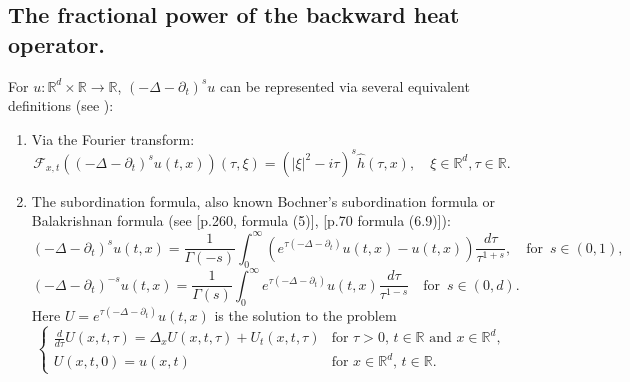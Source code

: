 \documentclass[11pt, twoside, notitlepage]{amsart}
\newcommand\R{\mathbb{R}}
\newcommand\RN{\mathbb{R}^N}
\numberwithin{equation}{section}
\begin{document}
\subsection{The fractional power of the backward heat operator.}  For $u:\R^d\times \R  \to \R$,
$(-\Delta-\partial_t)^s u $ can be represented via several equivalent definitions (see \cite{StingaTorreaMastersEq,BanerjeeGarofalo}):
\begin{enumerate}
\item[(a)] Via the Fourier transform:
\begin{equation}
	\mathcal{F}_{x,t}((-\Delta-\partial_t)^s u(t,x)) (\tau,\xi)=(|\xi|^2-i \tau)^s \widehat{h}(\tau,x), \quad \xi \in \R^d, \tau\in \R.
\end{equation}
\item[(b)] The subordination formula, also known Bochner's subordination formula or Balakrishnan formula (see [p.260, formula (5)]\cite{Yosida},  [p.70 formula (6.9)]\cite{Pazy}):
\begin{equation}\label{def:FracHeatOperator}
(-\Delta-\partial_t)^s u(t,x) =\frac{1}{\Gamma(-s)}\int_0^\infty \left(e^{\tau (-\Delta-\partial_t) } u(t,x)- u(t,x)\right) \frac{d\tau}{\tau^{1+s}}, \quad \text{for } \, s\in (0,1),
\end{equation}
\begin{equation}\label{def:InverseFracHeatOperator}
(-\Delta-\partial_t)^{-s} u(t,x) =\frac{1}{\Gamma(s)}\int_0^\infty e^{\tau (-\Delta-\partial_t) } u(t,x) \frac{d\tau}{\tau^{1-s}}\quad \text{for } \, s\in (0,d).
\end{equation}
Here $U=e^{\tau (-\Delta-\partial_t) } u(t,x)$ is the solution to the problem
\begin{equation}\label{eq2:U-RN}
  \left\{ \begin{array}{ll}
  \frac{d}{d\tau}U(x,t,\tau)=\Delta_{x} U(x,t,\tau) +  U_t(x,t,\tau) &\text{for }\tau>0,\, t \in  \R \text{ and } x \in \R^d,  \\[2mm]
  U(x,t,0)=u(x,t) &\text{for } x \in \R^d, \, t \in  \R .
    \end{array}
    \right.
\end{equation}
\end{enumerate}
\end{document}
